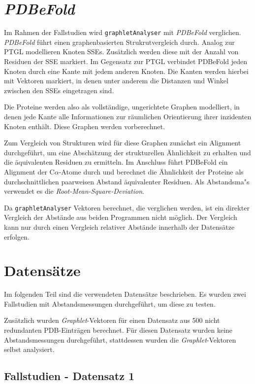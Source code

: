 \documentclass{report}
\begin{document}
\section{\textit{PDBeFold}}

Im Rahmen der Fallstudien wird \texttt{graphletAnalyser} mit \textit{PDBeFold} \cite{pdbefold} verglichen. \textit{PDBeFold} f\"uhrt einen graphenbasierten Strukrutvergleich durch. Analog zur PTGL modellieren Knoten SSEs. Zus\"atzlich werden diese mit der Anzahl von Residuen der SSE markiert. Im Gegensatz zur PTGL verbindet PDBeFold jeden Knoten durch eine Kante mit jedem anderen Knoten. Die Kanten werden hierbei mit Vektoren markiert, in denen unter anderem die Distanzen und Winkel zwischen den SSEs eingetragen sind.

Die Proteine werden also als vollst\"andige, ungerichtete Graphen modelliert, in denen jede Kante alle Informationen zur r\"aumlichen Orientierung ihrer inzidenten Knoten enth\"alt. Diese Graphen werden vorberechnet.

Zum Vergleich von Strukturen wird f\"ur diese Graphen zun\"achst ein Alignment durchgef\"uhrt, um eine Absch\"atzung der strukturellen \"Ahnlichkeit zu erhalten und die \"aquivalenten Residuen zu ermitteln. Im Anschluss f\"uhrt PDBeFold ein Alignment der C$\alpha$-Atome durch und berechnet die \"Ahnlichkeit der Proteine als durchschnittlichen paarweisen Abstand \"aquivalenter Residuen. Als Abstandsma"s verwendet es die \textit{Root-Mean-Square-Deviation}.

Da \texttt{graphletAnalyser} Vektoren berechnet, die verglichen werden, ist ein direkter Vergleich der Abst\"ande aus beiden Programmen nicht m\"oglich. Der Vergleich kann nur durch einen Vergleich relativer Abst\"ande innerhalb der Datens\"atze erfolgen.


\section{Datens\"atze}

Im folgenden Teil sind die verwendeten Datens\"atze beschrieben. Es wurden zwei Fallstudien mit Abstandsmessungen durchgef\"uhrt, um diese zu testen.

Zus\"atzlich wurden \textit{Graphlet}-Vektoren f\"ur einen Datensatz aus 500 nicht redundanten PDB-Eintr\"agen berechnet. F\"ur diesen Datensatz wurden keine Abstandsmessungen durchgef\"uhrt, stattdessen wurden die \textit{Graphlet}-Vektoren selbst analysiert.


\subsection{Fallstudien  - Datensatz 1}
\end{document}
